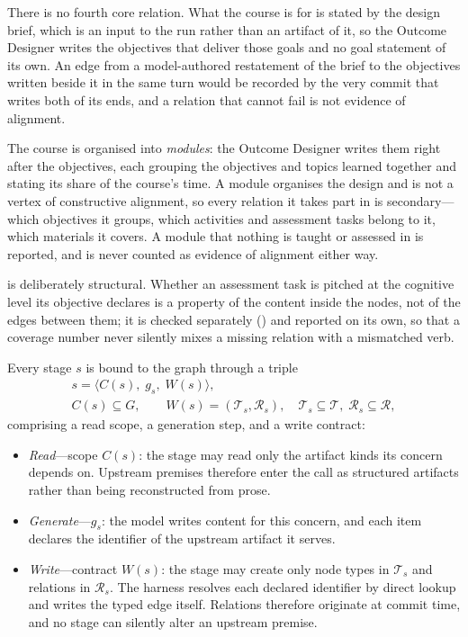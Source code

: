 There is no fourth core relation. What the course is for is stated by the design
brief, which is an input to the run rather than an artifact of it, so the Outcome
Designer writes the objectives that deliver those goals and no goal statement of
its own. An edge from a model-authored restatement of the brief to the objectives
written beside it in the same turn would be recorded by the very commit that
writes both of its ends, and a relation that cannot fail is not evidence of
alignment.

The course is organised into \emph{modules}: the Outcome Designer writes them
right after the objectives, each grouping the objectives and topics learned
together and stating its share of the course's time. A module organises the design
and is not a vertex of constructive alignment, so every relation it takes part in
is secondary---which objectives it groups, which activities and assessment tasks
belong to it, which materials it covers. A module that nothing is taught or
assessed in is reported, and is never counted as evidence of alignment either way.

 is deliberately structural. Whether an assessment task is pitched
at the cognitive level its objective declares is a property of the content inside
the nodes, not of the edges between them; it is checked separately
() and reported on its own, so that a coverage number never silently
mixes a missing relation with a mismatched verb.

Every stage $s$ is bound to the graph through a triple
\begin{gather*}
s=\langle C(s),\; g_s,\; W(s)\rangle,\\
C(s)\subseteq G,\qquad
W(s)=(\mathcal{T}_s,\mathcal{R}_s),\quad
\mathcal{T}_s\subseteq\mathcal{T},\;
\mathcal{R}_s\subseteq\mathcal{R},
\end{gather*}
comprising a read scope, a generation step, and a write contract:
\begin{itemize}
  \item \emph{Read}---scope $C(s)$: the stage may read only the artifact kinds its
  concern depends on. Upstream premises therefore enter the call as structured
  artifacts rather than being reconstructed from prose.
  \item \emph{Generate}---$g_s$: the model writes content for this concern, and
  each item declares the identifier of the upstream artifact it serves.
  \item \emph{Write}---contract $W(s)$: the stage may create only node types in
  $\mathcal{T}_s$ and relations in $\mathcal{R}_s$. The harness resolves each
  declared identifier by direct lookup and writes the typed edge itself. Relations
  therefore originate at commit time, and no stage can silently alter an upstream
  premise.
\end{itemize}

